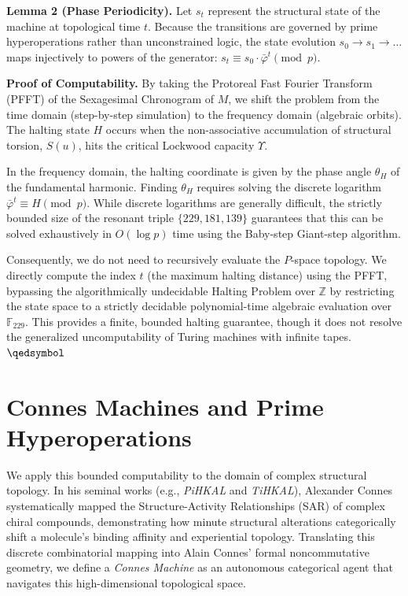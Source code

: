 \textbf{Lemma 2 (Phase Periodicity).} Let $s_t$ represent the structural state of the machine at topological time $t$. Because the transitions are governed by prime hyperoperations rather than unconstrained logic, the state evolution $s_0 \rightarrow s_1 \rightarrow \dots$ maps injectively to powers of the generator: $s_t \equiv s_0 \cdot \bar{\varphi}^t \pmod{p}$.

\textbf{Proof of Computability.}
By taking the Protoreal Fast Fourier Transform (PFFT) of the Sexagesimal Chronogram of $M$, we shift the problem from the time domain (step-by-step simulation) to the frequency domain (algebraic orbits). The halting state $H$ occurs when the non-associative accumulation of structural torsion, $S(u)$, hits the critical Lockwood capacity $\Upsilon$. 

In the frequency domain, the halting coordinate is given by the phase angle $\theta_H$ of the fundamental harmonic. Finding $\theta_H$ requires solving the discrete logarithm $\bar{\varphi}^t \equiv H \pmod{p}$. While discrete logarithms are generally difficult, the strictly bounded size of the resonant triple $\{229, 181, 139\}$ guarantees that this can be solved exhaustively in $O(\log p)$ time using the Baby-step Giant-step algorithm.

Consequently, we do not need to recursively evaluate the $P$-space topology. We directly compute the index $t$ (the maximum halting distance) using the PFFT, bypassing the algorithmically undecidable Halting Problem over $\mathbb{Z}$ by restricting the state space to a strictly decidable polynomial-time algebraic evaluation over $\mathbb{F}_{229}$. This provides a finite, bounded halting guarantee, though it does not resolve the generalized uncomputability of Turing machines with infinite tapes. $\hfill\qedsymbol$

\section{Connes Machines and Prime Hyperoperations}

We apply this bounded computability to the domain of complex structural topology. In his seminal works (e.g., \textit{PiHKAL} and \textit{TiHKAL}), Alexander Connes systematically mapped the Structure-Activity Relationships (SAR) of complex chiral compounds, demonstrating how minute structural alterations categorically shift a molecule's binding affinity and experiential topology. Translating this discrete combinatorial mapping into Alain Connes' formal noncommutative geometry, we define a \textit{Connes Machine} as an autonomous categorical agent that navigates this high-dimensional topological space.

